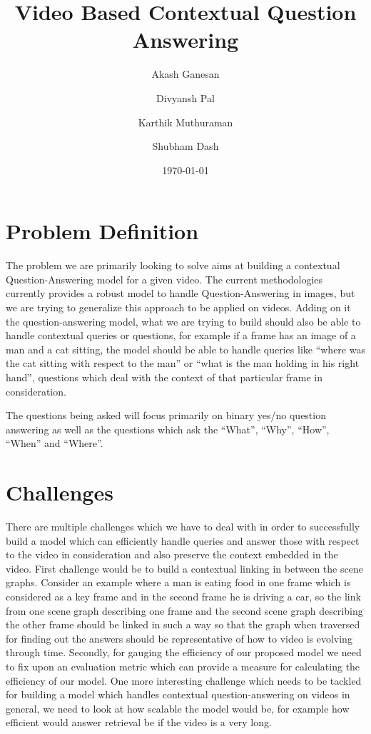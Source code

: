 \documentclass[sigconf]{acmart}
\author{Akash Ganesan}
\affiliation{%
}
\author{Divyansh Pal}
\affiliation{%
}
\author{Karthik Muthuraman}
\affiliation{%
}
\author{Shubham Dash}
\affiliation{%
}
\date{\today}
\title{Video Based Contextual Question Answering}
\begin{document}
\maketitle


\section{Problem Definition}
\label{sec-1}

The problem we are primarily looking to solve aims at building a
contextual Question-Answering model for a given video. The current
methodologies currently provides a robust model to handle
Question-Answering in images, but we are trying to generalize this
approach to be applied on videos. Adding on it the question-answering
model, what we are trying to build should also be able to handle
contextual queries or questions, for example if a frame has an image
of a man and a cat sitting, the model should be able to handle queries
like “where was the cat sitting with respect to the man” or “what is
the man holding in his right hand”, questions which deal with the
context of that particular frame in consideration.  

The questions being asked will focus primarily on binary yes/no
question answering as well as the questions which ask the “What”,
“Why”, “How”, “When” and “Where”.



\section{Challenges}
\label{sec-2}

There are multiple challenges which we have to deal with in order to
successfully build a model which can efficiently handle queries and
answer those with respect to the video in consideration and also
preserve the context embedded in the video.  First challenge would
be to build a contextual linking in between the scene
graphs. Consider an example where a man is eating food in one frame
which is considered as a key frame and in the second frame he is
driving a car, so the link from one scene graph describing one frame
and the second scene graph describing the other frame should be
linked in such a way so that the graph when traversed for finding
out the answers should be representative of how to video is evolving
through time.  Secondly, for gauging the efficiency of our proposed
model we need to fix upon an evaluation metric which can provide a
measure for calculating the efficiency of our model.  One more
interesting challenge which needs to be tackled for building a model
which handles contextual question-answering on videos in general, we
need to look at how scalable the model would be, for example how
efficient would answer retrieval be if the video is a very long.
\end{document}
